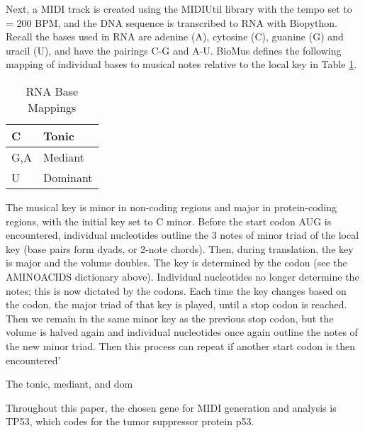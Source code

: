 \documentclass[letterpaper]{article}
\begin{document}
Next, a MIDI track is created using the MIDIUtil library with the tempo set to \musQuarter\;= 200 BPM, and the DNA sequence is transcribed to RNA with Biopython. Recall the bases used in RNA are adenine (A), cytosine (C), guanine (G) and uracil (U), and have the pairings C-G and A-U. BioMus defines the following mapping of individual bases to musical notes relative to the local key in Table  \ref{table:nucleotides}.

\begin{table}[h!]
\centering
\begin{tabular}{|l|l|}
\hline
C   & Tonic    \\ \hline
G,A & Mediant  \\ \hline
U   & Dominant \\ \hline
\end{tabular}
\caption{RNA Base Mappings}
\label{table:nucleotides}
\end{table}

The musical key is minor in non-coding regions and major in protein-coding regions, with the initial key set to C minor. Before the start codon AUG is encountered, individual nucleotides outline the 3 notes of minor triad of the local key (base pairs form dyads, or 2-note chords). Then, during translation, the key is major and the volume doubles. The
        key is determined by the codon (see the AMINOACIDS dictionary above). Individual nucleotides no longer determine the notes; this is now dictated
        by the codons. Each time the key changes based on the codon, the major triad of that key is played, until a stop codon is reached. Then we remain in
        the same minor key as the previous stop codon, but the volume is halved again and individual nucleotides once again outline the notes of the new
        minor triad. Then this process can repeat if another start codon is then encountered'


The tonic, mediant, and dom

Throughout this paper, the chosen gene for MIDI generation and analysis is TP53, which codes for the tumor suppressor protein p53. 
\end{document}
